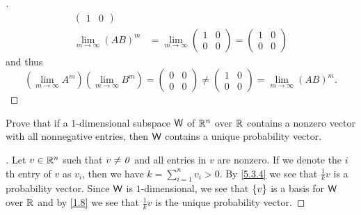 \begin{proof}[]
\begin{align*}
\begin{pmatrix}
                                                                         1 & 0
                                                                       \end{pmatrix} \\
    \lim_{m \to \infty} (AB)^m & = \lim_{m \to \infty} \begin{pmatrix}
                                                         1 & 0 \\
                                                         0 & 0
                                                       \end{pmatrix} = \begin{pmatrix}
                                                                         1 & 0 \\
                                                                         0 & 0
                                                                       \end{pmatrix}
  \end{align*}
  and thus
  \[
    (\lim_{m \to \infty} A^m) (\lim_{m \to \infty} B^m) = \begin{pmatrix}
      0 & 0 \\
      0 & 0
    \end{pmatrix} \neq \begin{pmatrix}
      1 & 0 \\
      0 & 0
    \end{pmatrix} = \lim_{m \to \infty} (AB)^m.
  \]
\end{proof}

\setcounter{ex}{14}
\begin{ex}\label{ex:5.3.15}
  Prove that if a \(1\)-dimensional subspace \(\mathsf{W}\) of \(\mathbb{R}^n\) over \(\mathbb{R}\) contains a nonzero vector with all nonnegative entries, then \(\mathsf{W}\) contains a unique probability vector.
\end{ex}

\begin{proof}[]
  Let \(v \in \mathbb{R}^n\) such that \(v \neq \mathit{0}\) and all entries in \(v\) are nonzero.
  If we denote the \(i\)th entry of \(v\) as \(v_i\), then we have \(k = \sum_{i = 1}^n v_i > 0\).
  By \cref{5.3.4} we see that \(\frac{1}{k} v\) is a probability vector.
  Since \(\mathsf{W}\) is \(1\)-dimensional, we see that \(\left\lbrace v\right\rbrace\) is a basis for \(\mathsf{W}\) over \(\mathbb{R}\) and by \cref{1.8} we see that \(\frac{1}{k} v\) is the unique probability vector.
\end{proof}


